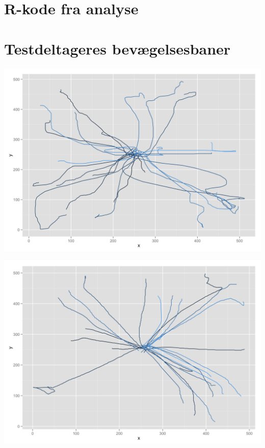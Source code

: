 \begin{appendices}
\chapter{R-kode fra analyse}
\label{sec:r-code}


\chapter{Testdeltageres bevægelsesbaner}
\label{sec:movementlines}
\begin{minipage}{\textwidth}
	\begin{minipage}{0.5\linewidth}
		\includegraphics[width=\linewidth]{images/plots/plot_analysis_qualitative_77}
	\end{minipage}
	\begin{minipage}{0.5\linewidth}
		\includegraphics[width=\linewidth]{images/plots/plot_analysis_qualitative_45}

\end{minipage}
\end{minipage}
\end{appendices}
